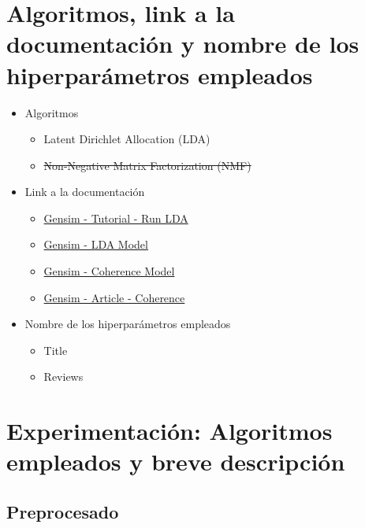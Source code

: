 \documentclass{report}
\begin{document}
{{        \section{Algoritmos, link a la documentación y nombre de los hiperparámetros empleados}
            \begin{itemize}
                \item Algoritmos
                \begin{itemize}
                    \item Latent Dirichlet Allocation (LDA)
                    \item \st{Non-Negative Matrix Factorization (NMF)}
                \end{itemize}
                \item Link a la documentación
                \begin{itemize}
                    \item \href{https://radimrehurek.com/gensim/auto_examples/tutorials/run_lda.html}{Gensim - Tutorial - Run LDA}
                    \item \href{https://radimrehurek.com/gensim/models/ldamodel.html}{Gensim - LDA Model}
                    \item \href{https://radimrehurek.com/gensim/models/coherencemodel.html}{Gensim - Coherence Model}
                    \item \href{https://gensimr.news-r.org/articles/coherence}{Gensim - Article - Coherence}
                \end{itemize}
                \item Nombre de los hiperparámetros empleados
                \begin{itemize}
                    \item Title
                    \item Reviews
                \end{itemize}
            \end{itemize}
        \clearpage\section{Experimentación: Algoritmos empleados y breve descripción}
            \subsection{Preprocesado}
}}
\end{document}
